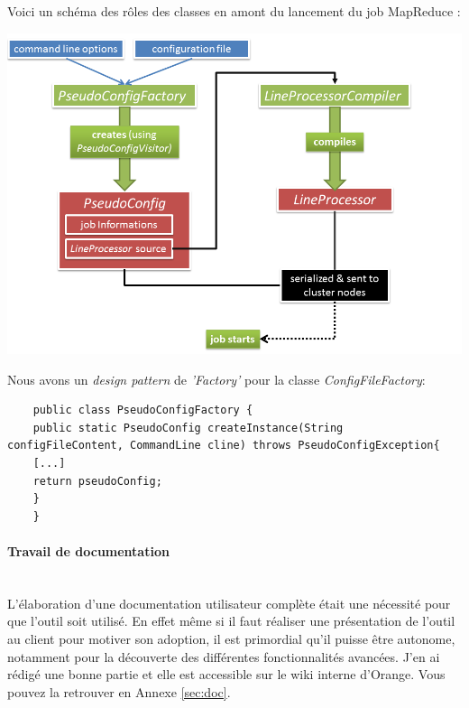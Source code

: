 \documentclass[12pt]{report}
\newcommand{\namedparagraph}[1]{\paragraph*{#1}\mbox{}\\}
\begin{document}
	Voici un schéma des rôles des classes en amont du lancement du job MapReduce :
	\begin{center}
		\includegraphics[scale=0.7]{schema.png}
	\end{center}
	Nous avons un \textit{design pattern} de \textit{'Factory'} pour la classe \textit{ConfigFileFactory}:
	\begin{lstlisting}
	public class PseudoConfigFactory {
	public static PseudoConfig createInstance(String configFileContent, CommandLine cline) throws PseudoConfigException{
	[...]
	return pseudoConfig;
	}
	}
	\end{lstlisting}
	\namedparagraph{Travail de documentation}
	L'élaboration d'une documentation utilisateur complète était une nécessité pour que l'outil soit utilisé. En effet même si il faut réaliser une présentation de l'outil au client pour motiver son adoption, il est primordial qu'il puisse être autonome, notamment pour la découverte des différentes fonctionnalités avancées. J'en ai rédigé une bonne partie et elle est accessible sur le wiki interne d'Orange. Vous pouvez la retrouver en Annexe \ref{sec:doc}.
	
\end{document}
